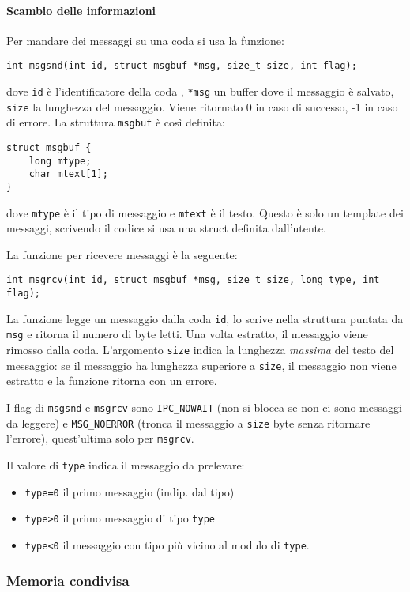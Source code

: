 \documentclass[a4paper]{article}
\begin{document}
\paragraph{Scambio delle informazioni}
Per mandare dei messaggi su una coda si usa la funzione:
\begin{verbatim}
int msgsnd(int id, struct msgbuf *msg, size_t size, int flag);
\end{verbatim}
dove \verb|id| è l'identificatore della coda , \verb|*msg| un buffer dove il messaggio è salvato, \verb|size| la lunghezza del messaggio. Viene ritornato 0 in caso di successo, -1 in caso di errore.
La struttura \verb|msgbuf| è così definita:
\begin{verbatim}
struct msgbuf {
    long mtype;
    char mtext[1];
}
\end{verbatim}
dove \verb|mtype| è il tipo di messaggio e \verb|mtext| è il testo.
Questo è solo un template dei messaggi, scrivendo il codice si usa una struct definita dall'utente.

La funzione per ricevere messaggi è la seguente:
\begin{verbatim}
int msgrcv(int id, struct msgbuf *msg, size_t size, long type, int flag);
\end{verbatim}
La funzione legge un messaggio dalla coda \verb|id|, lo scrive nella struttura puntata da \verb|msg| e ritorna il numero di byte letti. Una volta estratto, il messaggio viene rimosso dalla coda.
L'argomento \verb|size| indica la lunghezza \textit{massima} del testo del messaggio: se il messaggio ha lunghezza superiore a \verb|size|, il messaggio non viene estratto e la funzione ritorna con un errore.

I flag di \verb|msgsnd| e \verb|msgrcv| sono \verb|IPC_NOWAIT| (non si blocca se non ci sono messaggi da leggere) e \verb|MSG_NOERROR| (tronca il messaggio a \verb|size| byte senza ritornare l'errore), quest'ultima solo per \verb|msgrcv|.

Il valore di \verb|type| indica il messaggio da prelevare:
\begin{itemize}
\item \verb|type=0| il primo messaggio (indip. dal tipo)
\item \verb|type>0| il primo messaggio di tipo \verb|type|
\item \verb|type<0| il messaggio con tipo più vicino al modulo di \verb|type|.
\end{itemize}
\newpage

\subsubsection{Memoria condivisa}
\end{document}
